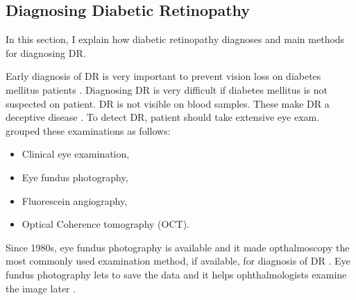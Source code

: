 \subsection{Diagnosing Diabetic Retinopathy}

In this section, I explain how diabetic retinopathy diagnoses and main methods for diagnosing DR.

Early diagnosis of DR is very important to prevent vision loss on diabetes mellitus patients \citep{mankarautomatic}. Diagnosing DR is very difficult if diabetes mellitus is not suspected on patient. DR is not visible on blood samples. These make DR a deceptive disease \citep{kauppi2010eye}. To detect DR, patient should take extensive eye exam. \citet{kauppi2010eye} grouped these examinations as follows:
\begin{itemize}
    \item Clinical eye examination,
    \item Eye fundus photography,
    \item Fluorescein angiography,
    \item Optical Coherence tomography (OCT).
\end{itemize}
Since 1980s, eye fundus photography is available and it made opthalmoscopy the most commonly used examination method, if available, for diagnosis of DR \citep{wendt2005screening}. Eye fundus photography lets to save the data and it helps ophthalmologists examine the image later \citep{hutchinson2000effectiveness}. 

